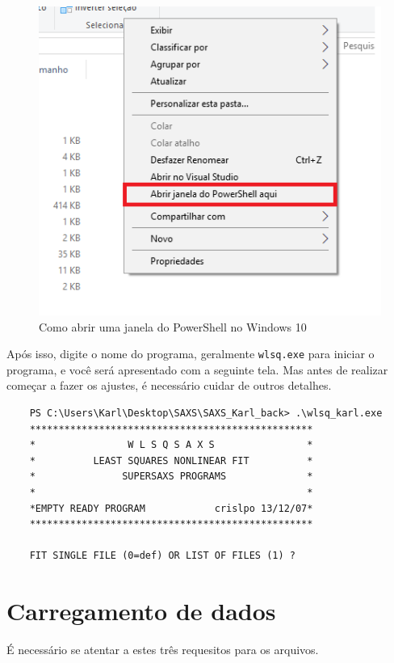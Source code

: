 \begin{apendicesenv}
\begin{figure}[t]
	\includegraphics[scale=0.5]{./imagens/saxs/supersaxs_Powershell}
	\centering
	\caption{Como abrir uma janela do PowerShell no Windows 10}
	\centering
\end{figure}

Após isso, digite o nome do programa, geralmente \texttt{wlsq.exe} para iniciar o programa, e você será apresentado com a seguinte tela. Mas antes de realizar começar a fazer os ajustes, é necessário cuidar de outros detalhes.
\begin{samepage}
	\begin{verbatim}
	PS C:\Users\Karl\Desktop\SAXS\SAXS_Karl_back> .\wlsq_karl.exe
	*************************************************
	*                W L S Q S A X S                *
	*          LEAST SQUARES NONLINEAR FIT          *
	*               SUPERSAXS PROGRAMS              *
	*                                               *
	*EMPTY READY PROGRAM            crislpo 13/12/07*
	*************************************************
	
	FIT SINGLE FILE (0=def) OR LIST OF FILES (1) ?
	\end{verbatim}
\end{samepage}

\section{Carregamento de dados}

É necessário se atentar a estes três requesitos para os arquivos.


\end{apendicesenv}
